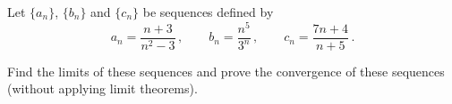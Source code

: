 \documentclass[week=2]{homework}
\begin{document}
\begin{questions}
	    
	    \question
	    Let $\{a_n\}$, $\{b_n\}$ and $\{c_n\}$ be sequences defined by
	    \[
		    a_n = \frac{n+3}{n^2-3}\,,\qquad b_n = \frac{n^5}{3^n}\,,\qquad c_n = \frac{7n+4}{n+5}\,.
	    \]
	    
	    Find the limits of these sequences and prove the convergence of these sequences (without applying limit theorems).
	    \begin{parts}
	    	\part
	    	
	    	\part 
	    	
	    	\part
	    \end{parts}
     \end{questions}
\end{document}
